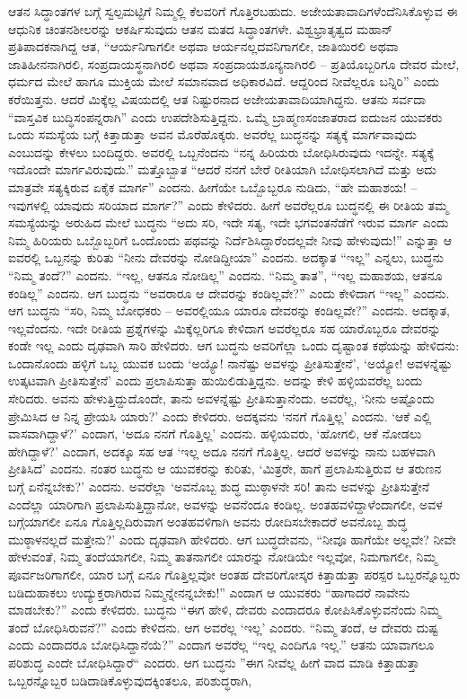 ಆತನ ಸಿದ್ಧಾಂತಗಳ ಬಗ್ಗೆ ಸ್ವಲ್ಪಮಟ್ಟಿಗೆ ನಿಮ್ಮಲ್ಲಿ ಕೆಲವರಿಗೆ ಗೊತ್ತಿರಬಹುದು. ಅಜೇಯತಾವಾದಿಗಳೆಂದೆನಿಸಿಕೊಳ್ಳುವ ಈ ಆಧುನಿಕ ಚಿಂತನಶೀಲರನ್ನು ಆಕರ್ಷಿಸುವುದು ಆತನ ಮತದ ಸಿದ್ಧಾಂತಗಳೇ. ವಿಶ್ವಭ್ರಾತೃತ್ವದ ಮಹಾನ್ ಪ್ರತಿಪಾದಕನಾಗಿದ್ದ ಆತ, “ಆರ್ಯನಿಗಾಗಲೀ ಅಥವಾ ಆರ್ಯನಲ್ಲದವನಿಗಾಗಲೀ, ಜಾತಿಯಿರಲಿ ಅಥವಾ ಜಾತಿಹೀನನಾಗಿರಲಿ, ಸಂಪ್ರದಾಯಸ್ಥನಾಗಿರಲಿ ಅಥವಾ ಸಂಪ್ರದಾಯಶೂನ್ಯನಾಗಿರಲಿ – ಪ್ರತಿಯೊಬ್ಬರಿಗೂ ದೇವರ ಮೇಲೆ, ಧರ್ಮದ ಮೇಲೆ ಹಾಗೂ ಮುಕ್ತಿಯ ಮೇಲೆ ಸಮಾನವಾದ ಅಧಿಕಾರವಿದೆ. ಆದ್ದರಿಂದ ನೀವೆಲ್ಲರೂ ಬನ್ನಿರಿ” ಎಂದು ಕರೆಯಿತ್ತನು. ಆದರೆ ಮಿಕ್ಕೆಲ್ಲ ವಿಷಯದಲ್ಲಿ ಆತ ನಿಷ್ಟುರನಾದ ಅಜೇಯತಾವಾದಿಯಾಗಿದ್ದನು. ಆತನು ಸರ್ವದಾ “ವಾಸ್ತವಿಕ ಬುದ್ಧಿಸಂಪನ್ನರಾಗಿ” ಎಂದು ಉಪದೇಶಿಸುತ್ತಿದ್ದನು. ಒಮ್ಮೆ ಬ್ರಾಹ್ಮಣಸಂಜಾತರಾದ ಐದುಜನ ಯುವಕರು ಒಂದು ಸಮಸ್ಯೆಯ ಬಗ್ಗೆ ಕಿತ್ತಾಡುತ್ತಾ ಅವನ ಮೊರೆಹೊಕ್ಕರು. ಅವರೆಲ್ಲ ಬುದ್ಧನನ್ನು ಸತ್ಯಕ್ಕೆ ಮಾರ್ಗವಾವುದು ಎಂಬುದನ್ನು ಕೇಳಲು ಬಂದಿದ್ದರು. ಅವರಲ್ಲಿ ಒಬ್ಬನೆಂದನು “ನನ್ನ ಹಿರಿಯರು ಬೋಧಿಸಿರುವುದು ಇದನ್ನೇ. ಸತ್ಯಕ್ಕೆ ಇದೊಂದೇ ಮಾರ್ಗವಿರುವುದು.” ಮತ್ತೊಬ್ಬಾತ “ಆದರೆ ನನಗೆ ಬೇರೆ ರೀತಿಯಾಗಿ ಬೋಧಿಸಲಾಗಿದೆ ಮತ್ತು ಅದು ಮಾತ್ರವೇ ಸತ್ಯಕ್ಕಿರುವ ಏಕೈಕ ಮಾರ್ಗ” ಎಂದನು. ಹೀಗೆಯೇ ಒಬ್ಬೊಬ್ಬರೂ ನುಡಿದು, “ಹೇ ಮಹಾಶಯ! – ಇವುಗಳಲ್ಲಿ ಯಾವುದು ಸರಿಯಾದ ಮಾರ್ಗ?” ಎಂದು ಕೇಳಿದರು. ಹೀಗೆ ಅವರೆಲ್ಲರೂ ಬುದ್ಧನಲ್ಲಿ ಈ ರೀತಿಯ ತಮ್ಮ ಸಮಸ್ಯೆಯನ್ನು ಅರುಹಿದ ಮೇಲೆ ಬುದ್ಧನು “ಅದು ಸರಿ, ಇದೇ ಸತ್ಯ, ಇದೇ ಭಗವಂತನೆಡೆಗೆ ಇರುವ ಮಾರ್ಗ ಎಂದು ನಿಮ್ಮ ಹಿರಿಯರು ಒಬ್ಬೊಬ್ಬರಿಗೆ ಒಂದೊಂದು ಪಥವನ್ನು ನಿರ್ದೆಶಿಸಿದ್ದಾರೆಂದಲ್ಲವೇ ನೀವು ಹೇಳುವುದು!” ಎನ್ನುತ್ತಾ ಆ ಐವರಲ್ಲಿ ಒಬ್ಬನನ್ನು ಕುರಿತು “ನೀನು ದೇವರನ್ನು ನೋಡಿದ್ದೀಯಾ” ಎಂದನು. ಅದಕ್ಕಾತ “ಇಲ್ಲ” ಎನ್ನಲು, ಬುದ್ಧನು “ನಿಮ್ಮ ತಂದೆ?” ಎಂದನು. “ಇಲ್ಲ, ಆತನೂ ನೋಡಿಲ್ಲ” ಎಂದನು. “ನಿಮ್ಮ ತಾತ”, “ಇಲ್ಲ ಮಹಾಶಯ, ಆತನೂ ಕಂಡಿಲ್ಲ” ಎಂದನು. ಆಗ ಬುದ್ಧನು “ಅವರಾರೂ ಆ ದೇವರನ್ನು ಕಂಡಿಲ್ಲವೇ?” ಎಂದು ಕೇಳಿದಾಗ “ಇಲ್ಲ” ಎಂದನು. ಆಗ ಬುದ್ಧನು “ಸರಿ, ನಿಮ್ಮ ಬೋಧಕರು – ಅವರಲ್ಲಿಯೂ ಯಾರೂ ದೇವರನ್ನು ಕಂಡಿಲ್ಲವೇ?” ಎಂದನು. ಅದಕ್ಕಾತ, ಇಲ್ಲವೆಂದನು. ಇದೇ ರೀತಿಯ ಪ್ರಶ್ನೆಗಳನ್ನು ಮಿಕ್ಕೆಲ್ಲರಿಗೂ ಕೇಳಿದಾಗ ಅವರೆಲ್ಲರೂ ಸಹ ಯಾರೊಬ್ಬರೂ ದೇವರನ್ನು ಕಂಡೇ ಇಲ್ಲ ಎಂದು ದೃಢವಾಗಿ ಸಾರಿ ಹೇಳಿದರು. ಆಗ ಬುದ್ಧನು ಅವರಿಗೆಲ್ಲಾ ಒಂದು ದೃಷ್ಟಾಂತ ಕಥೆಯನ್ನು ಹೇಳಿದನು: ಒಂದಾನೊಂದು ಹಳ್ಳಿಗೆ ಒಬ್ಬ ಯುವಕ ಬಂದು ‘ಅಯ್ಯೊ! ನಾನೆಷ್ಟು ಅವಳನ್ನು ಪ್ರೀತಿಸುತ್ತೇನೆ’, ‘ಅಯ್ಯೋ! ಅವಳನ್ನೆಷ್ಟು ಉತ್ಕಟವಾಗಿ ಪ್ರೀತಿಸುತ್ತೇನೆ’ ಎಂದು ಪ್ರಲಾಪಿಸುತ್ತಾ ಹುಯಿಲಿಡುತ್ತಿದ್ದನು. ಅದನ್ನು ಕೇಳಿ ಹಳ್ಳಿಯವರೆಲ್ಲ ಬಂದು ಸೇರಿದರು. ಅವನು ಹೇಳುತ್ತಿದ್ದುದೊಂದೇ, ತಾನು ಅವಳನ್ನೆಷ್ಟು ಪ್ರೀತಿಸುತ್ತಾನೆಂದು. ಅವರೆಲ್ಲ, ‘ನೀನು ಅಷ್ಟೊಂದು ಪ್ರೇಮಿಸಿದ ಆ ನಿನ್ನ ಪ್ರೇಯಸಿ ಯಾರು?’ ಎಂದು ಕೇಳಿದರು. ಅದಕ್ಕವನು ‘ನನಗೆ ಗೊತ್ತಿಲ್ಲ’ ಎಂದನು. ‘ಆಕೆ ಎಲ್ಲಿ ವಾಸವಾಗಿದ್ದಾಳೆ?’ ಎಂದಾಗ, ‘ಅದೂ ನನಗೆ ಗೊತ್ತಿಲ್ಲ’ ಎಂದನು. ಹಳ್ಳಿಯವರು, ‘ಹೋಗಲಿ, ಆಕೆ ನೋಡಲು ಹೇಗಿದ್ದಾಳೆ?’ ಎಂದಾಗ, ಅದಕ್ಕೂ ಸಹ ಆತ ‘ಇಲ್ಲ ಅದೂ ನನಗೆ ಗೊತ್ತಿಲ್ಲ. ಆದರೆ ಅವಳನ್ನು ನಾನು ಬಹಳವಾಗಿ ಪ್ರೀತಿಸಿದೆ’ ಎಂದನು. ನಂತರ ಬುದ್ಧನು ಆ ಯುವಕರನ್ನು ಕುರಿತು, ‘ಮಿತ್ರರೇ, ಹಾಗೆ ಪ್ರಲಾಪಿಸುತ್ತಿರುವ ಆ ತರುಣನ ಬಗ್ಗೆ ಏನೆನ್ನಬೇಕು?’ ಎಂದನು. ಅವರೆಲ್ಲಾ ‘ಅವನೊಬ್ಬ ಶುದ್ಧ ಮುಠ್ಠಾಳನೇ ಸರಿ! ತಾನು ಅವಳನ್ನು ಪ್ರೀತಿಸುತ್ತೇನೆ ಎಂದೆಲ್ಲಾ ಯಾರಿಗಾಗಿ ಪ್ರಲಾಪಿಸುತ್ತಿದ್ದಾನೋ, ಅವಳನ್ನು ಅವನೆಂದೂ ಕಂಡಿಲ್ಲ. ಅಂತಹವಳಿದ್ದಾಳೆಂದಾಗಲೀ, ಅವಳ ಬಗ್ಗೆಯಾಗಲೀ ಏನೂ ಗೊತ್ತಿಲ್ಲದಿರುವಾಗ ಅಂತಹವಳಿಗಾಗಿ ಅವನು ರೋದಿಸಬೇಕಾದರೆ ಅವನೊಬ್ಬ ಶುದ್ಧ ಮುಠ್ಠಾಳನಲ್ಲದೆ ಮತ್ತೇನು?’ ಎಂದು ದೃಢವಾಗಿ ಹೇಳಿದರು. ಆಗ ಬುದ್ಧದೇವನು, “ನೀವೂ ಹಾಗೆಯೇ ಅಲ್ಲವೇ? ನೀವೇ ಹೇಳುವಂತೆ, ನಿಮ್ಮ ತಂದೆಯಾಗಲೀ, ನಿಮ್ಮ ತಾತನಾಗಲೀ ಯಾರನ್ನು ನೋಡಿಯೇ ಇಲ್ಲವೋ, ನಿಮಗಾಗಲೀ, ನಿಮ್ಮ ಪೂರ್ವಜರಿಗಾಗಲೀ, ಯಾರ ಬಗ್ಗೆ ಏನೂ ಗೊತ್ತಿಲ್ಲವೋ ಅಂತಹ ದೇವರಿಗೋಸ್ಕರ ಕಿತ್ತಾಡುತ್ತಾ ಪರಸ್ಪರ ಒಬ್ಬರನ್ನೊಬ್ಬರು ಬಡಿದುಹಾಕಲು ಉದ್ಯುಕ್ತರಾಗಿರುವ ನಿಮ್ಮನ್ನೇನನ್ನಬೇಕು!” ಎಂದಾಗ ಆ ಯುವಕರು “ಹಾಗಾದರೆ ನಾವೇನು ಮಾಡಬೇಕು?” ಎಂದು ಕೇಳಿದರು. ಬುದ್ಧನು “ಈಗ ಹೇಳಿ, ದೇವರು ಎಂದಾದರೂ ಕೋಪಿಸಿಕೊಳ್ಳುವನೆಂದು ನಿಮ್ಮ ತಂದೆ ಬೋಧಿಸಿರುವನೆ?” ಎಂದು ಕೇಳಿದನು. ಆಗ ಅವರೆಲ್ಲ ‘ಇಲ್ಲ’ ಎಂದರು. “ನಿಮ್ಮ ತಂದೆ, ಆ ದೇವರು ದುಷ್ಟ ಎಂದು ಎಂದಾದರೂ ಬೋಧಿಸಿದ್ದಾನೆಯೆ?” ಎಂದಾಗ ಅವರೆಲ್ಲ “ಇಲ್ಲ ಎಂದಿಗೂ ಇಲ್ಲ.” ಆತನು ಯಾವಾಗಲೂ ಪರಿಶುದ್ಧ ಎಂದೇ ಬೋಧಿಸಿದ್ದಾರೆ“ ಎಂದರು. ಆಗ ಬುದ್ಧನು ”ಈಗ ನೀವೆಲ್ಲ ಹೀಗೆ ವಾದ ಮಾಡಿ ಕಿತ್ತಾಡುತ್ತಾ ಒಬ್ಬರನ್ನೊಬ್ಬರ ಬಡಿದಾಡಿಕೊಳ್ಳುವುದಕ್ಕಿಂತಲೂ, ಪರಿಶುದ್ಧರಾಗಿ, 